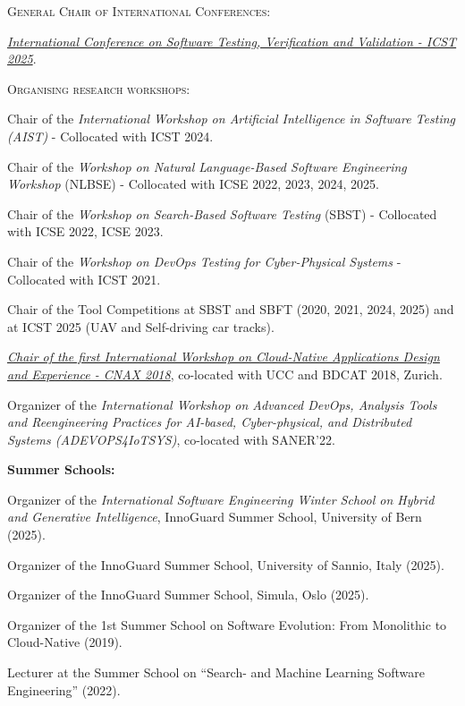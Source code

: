 \documentclass[11pt]{article}
\begin{document}
\medskip\medskip 

\textsc{General Chair of International Conferences:}
\begin{innerlist}
 \item \href{https://conf.researchr.org/home/icst-2025}{\textit{International Conference on Software Testing, Verification and Validation - ICST 2025}}.
\end{innerlist}

\medskip\medskip 

\textsc{Organising research workshops:}
\begin{innerlist}
\item Chair of the \textit{International Workshop on Artificial Intelligence in Software Testing (AIST)} - Collocated with ICST 2024.
\item Chair of the \textit{Workshop on Natural Language-Based Software Engineering Workshop} (NLBSE) - Collocated with ICSE 2022, 2023, 2024, 2025.
\item Chair of the \textit{Workshop on Search-Based Software Testing} (SBST) - Collocated with ICSE 2022, ICSE 2023.
\item Chair of the \textit{Workshop on DevOps Testing for Cyber-Physical Systems} - Collocated with ICST 2021.
\item Chair of the Tool Competitions at SBST and SBFT (2020, 2021, 2024, 2025) and at ICST 2025 (UAV and Self-driving car tracks).
\item \emph{\href{http://cnax.servicelaboratory.ch/}{Chair of the first International Workshop on Cloud-Native Applications Design and Experience - CNAX 2018}}, co-located with UCC and BDCAT 2018, Zurich.
\item Organizer of the \textit{International Workshop on Advanced DevOps, Analysis Tools and Reengineering Practices for AI-based, Cyber-physical, and Distributed Systems (ADEVOPS4IoTSYS)}, co-located with SANER’22.
\end{innerlist}

\medskip 

\textbf{Summer Schools:}
\begin{innerlist}
\item Organizer of the \textit{International Software Engineering Winter School on Hybrid and Generative Intelligence}, InnoGuard Summer School, University of Bern (2025).
\item Organizer of the InnoGuard Summer School, University of Sannio, Italy (2025).
\item Organizer of the InnoGuard Summer School, Simula, Oslo (2025).
\item Organizer of the 1st Summer School on Software Evolution: From Monolithic to Cloud-Native (2019).
\item Lecturer at the Summer School on ``Search- and Machine Learning Software Engineering'' (2022).
\end{innerlist}
\end{document}
